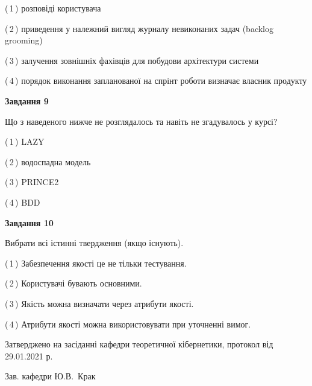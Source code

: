 \documentclass[10pt, ukrainian]{article}
\begin{document}
{\begin {large}
(\,1\,) розповіді користувача%



(\,2\,) приведення у належний вигляд журналу невиконаних задач (backlog grooming) %



(\,3\,) залучення зовнішніх фахівців для побудови архітектури системи%



(\,4\,) порядок виконання запланованої на спрінт роботи визначає власник продукту%


{\begin {center}\textbf{Завдання 9}\end {center}}\par
Що з наведеного нижче не розглядалось та навіть не згадувалось у курсі?\par
\vspace{2mm}



(\,1\,) LAZY%



(\,2\,) водоспадна модель%



(\,3\,) PRINCE2%



(\,4\,) BDD%


{\begin {center}\textbf{Завдання 10}\end {center}}\par
Вибрати всі істинні твердження (якщо існують).\par
\vspace{2mm}



(\,1\,) Забезпечення якості це не тільки тестування.%



(\,2\,) Користувачі бувають основними.%



(\,3\,) Якість можна визначати через атрибути якості.%



(\,4\,) Атрибути якості можна використовувати при уточненні вимог.%



\end {large}}
{\vspace{5mm}\smallskip \begin {small} Затверджено на засіданні кафедри теоретичної кібернетики, протокол  від   29.01.2021 р.\par\smallskip\smallskip
{\parbox {6.5 cm}{Зав. кафедри \dotfill Ю.В.~Крак}} \end{small}}
\newpage
\end{document}
